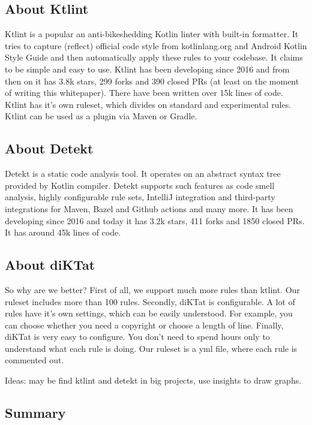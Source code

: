 \subsection{About Ktlint}
\par Ktlint is a popular an anti-bikeshedding Kotlin linter with built-in formatter. It tries to capture (reflect) official code style from kotlinlang.org and Android Kotlin Style Guide and then automatically apply these rules to your codebase. It claims to be simple and easy to use. Ktlint has been developing since 2016 and from then on it has 3.8k stars, 299 forks and 390 closed PRs (at least on the moment of writing this whitepaper). There have been written over 15k lines of code. Ktlint has it's own ruleset, which divides on standard and experimental rules. Ktlint can be used as a plugin via Maven or Gradle.

\subsection{About Detekt}
\par Detekt is a static code analysis tool. It operates on an abstract syntax tree provided by Kotlin compiler. Detekt supports such features as code smell analysis, highly configurable rule sets, IntelliJ integration and third-party integrations for Maven, Bazel and Github actions and many more. It has been developing since 2016 and today it has 3.2k stars, 411 forks and 1850 closed PRs. It has around 45k lines of code.

\subsection{About diKTat}
\par So why are we better? First of all, we support much more rules than ktlint. Our ruleset includes more than 100 rules. Secondly, diKTat is configurable. A lot of rules have it's own settings, which can be easily understood. For example, you can choose whether you need a copyright or choose a length of line. Finally, diKTat is very easy to configure. You don't need to spend hours only to understand what each rule is doing. Our ruleset is a yml file, where each rule is commented out.



Ideas: may be find ktlint and detekt in big projects, use insights to draw graphs. 


\subsection{Summary}

